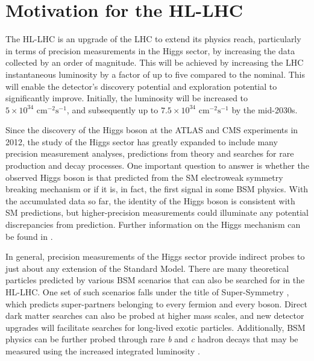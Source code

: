 \section{Motivation for the HL-LHC}
\label{hi-lumi}


The HL-LHC is an upgrade of the \ac{LHC} to extend its physics reach, particularly in terms of precision measurements in the Higgs sector, by increasing the data collected by an order of magnitude. This will be achieved by increasing the LHC instantaneous luminosity by a factor of up to five compared to the nominal. This will enable the detector's discovery potential and exploration potential to significantly improve. Initially, the luminosity will be increased to $5 \times 10^{34}  \text{ cm}^{−2}\text{s}^{−1}$, and subsequently up to $7.5 \times 10^{34}  \text{ cm}^{−2}\text{s}^{−1}$ by the mid-2030s.

Since the discovery of the Higgs boson at the ATLAS and CMS experiments \cite{ATLAS-HIGGS, CMS-HIGGS} in 2012, the study of the Higgs sector has greatly expanded to include many precision measurement analyses, predictions from theory and searches for rare production and decay processes. One important question to answer is whether the observed Higgs boson is that predicted from the SM electroweak symmetry breaking mechanism \cite{ewsb} or if it is, in fact, the first signal in some BSM physics. With the accumulated data so far, the identity of the Higgs boson is consistent with SM predictions, but higher-precision measurements could illuminate any potential discrepancies from prediction. Further information on the Higgs mechanism can be found in \cite{Bednyakov_2008}.


In general, precision measurements of the Higgs sector provide indirect probes to just about any extension of the Standard Model. There are many theoretical particles predicted by various BSM scenarios that can also be searched for in the HL-LHC. One set of such scenarios falls under the title of Super-Symmetry \cite{supersym}, which predicts super-partners belonging to every fermion and every boson. Direct dark matter searches can also be probed at higher mass scales, and new detector upgrades will facilitate searches for long-lived exotic particles. Additionally, BSM physics can be further probed through rare \textit{b} and \textit{c} hadron decays that may be measured using the increased integrated luminosity \cite{wg-bsm}.

